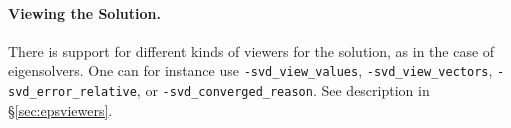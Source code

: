 \paragraph{Viewing the Solution.}

There is support for different kinds of viewers for the solution, as in the case of eigensolvers. One can for instance use \Verb!-svd_view_values!, \Verb!-svd_view_vectors!, \Verb!-svd_error_relative!, or \Verb!-svd_converged_reason!. See description in \S\ref{sec:epsviewers}.

